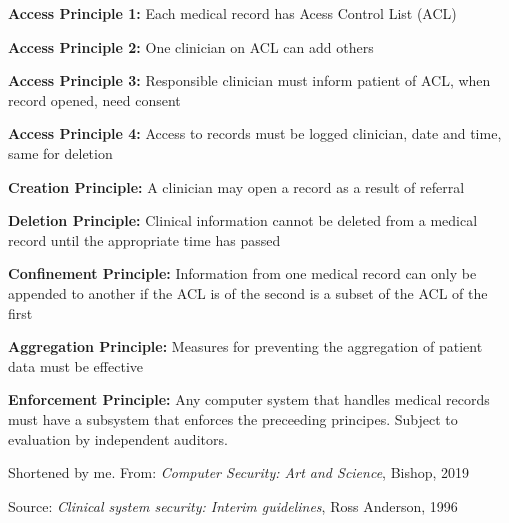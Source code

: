 \documentclass[Screen16to9,17pt]{foils}
\begin{document}

\begin{list2}
\item {\bf Access Principle 1:} Each medical record has Acess Control List (ACL)
\item {\bf Access Principle 2:} One clinician on ACL can add others
\item {\bf Access Principle 3:} Responsible clinician must inform patient of ACL, when record opened, need consent
\item {\bf Access Principle 4:} Access to records must be logged clinician, date and time, same for deletion
\item {\bf Creation Principle:} A clinician may open a record as a result of referral
\item {\bf Deletion Principle:} Clinical information cannot be deleted from a medical record until the appropriate time has passed
\item {\bf Confinement Principle:} Information from one medical record can only be appended to another if the ACL is of the second is a subset of the ACL of the first
\item {\bf Aggregation Principle:} Measures for preventing the aggregation of patient data must be effective
\item {\bf Enforcement Principle:} Any computer system that handles medical records must have a subsystem that enforces the preceeding principes. Subject to evaluation by independent auditors.
\end{list2}

Shortened by me. From:
\emph{Computer Security: Art and Science}, Bishop, 2019


Source:
\emph{Clinical system security: Interim guidelines}, Ross Anderson, 1996



\begin{list1}
\item
\item
\item
\item
\item
\end{list1}



\end{document}

